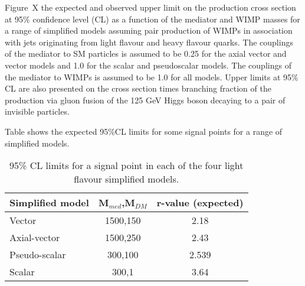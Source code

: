
Figure~X  
the expected and observed upper limit on the
production cross section at 95\% confidence level (CL) as a function
of the mediator and WIMP masses for a range of simplified models assuming
pair production of WIMPs in association with jets originating from light flavour and heavy flavour quarks. The couplings of the mediator to SM particles is assumed to be 0.25 for the axial vector and vector models and 1.0 for the scalar and pseudoscalar models. The couplings of the mediator to WIMPs is assumed to be 1.0 for all models. 
Upper limits at 95\% CL are also presented on the cross section times branching fraction of the production via gluon fusion of the 125 GeV Higgs boson decaying to a pair of invisible particles. 

Table shows the expected 95\%CL limits for some signal points for a range of simplified models. 
\begin{table}[h!]
  \caption{%
    95\% CL limits for a signal point in each of the four light flavour simplified models. }
  \label{tab:limits}
  \centering
  \begin{tabular}{ lcc }
    \hline
    \hline
    Simplified model              & M$_{med}$,M$_{DM}$          & r-value (expected) \\ \hline
Vector & 1500,150 & 2.18 \\
Axial-vector & 1500,250 & 2.43 \\
Pseudo-scalar & 300,100 & 2.539 \\
Scalar & 300,1 & 3.64 \\
    \hline
    \hline
  \end{tabular}
\end{table}



